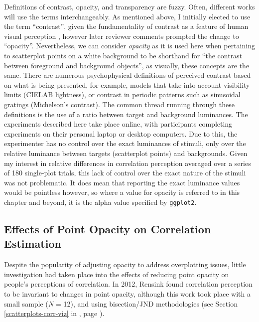 \documentclass[../main.tex]{subfiles}
\begin{document}
Definitions of contrast, opacity, and transparency are fuzzy. Often,
different works will use the terms interchangeably. As mentioned above,
I initially elected to use the term ``contrast'', given the
fundamentality of contrast as a feature of human visual perception
\cite{ginsburg_2003}, however later reviewer comments prompted the
change to ``opacity''. Nevertheless, we can consider \emph{opacity} as
it is used here when pertaining to scatterplot points on a white
background to be shorthand for ``the contrast between foreground and
background objects'', as visually, these concepts are the same. There
are numerous psychophysical definitions of perceived contrast
\cite{zuffi_2007} based on what is being presented, for example, models
that take into account visibility limits (CIELAB lightness), or contrast
in periodic patterns such as sinusoidal gratings (Michelson's contrast).
The common thread running through these definitions is the use of a
ratio between target and background luminances. The experiments
described here take place online, with participants completing
experiments on their personal laptop or desktop computers. Due to this,
the experimenter has no control over the exact luminances of stimuli,
only over the relative luminance between targets (scatterplot points)
and backgrounds. Given my interest in relative differences in
correlation perception averaged over a series of 180 single-plot trials,
this lack of control over the exact nature of the stimuli was not
problematic. It does mean that reporting the exact luminance values
would be pointless however, so where a value for opacity is referred to
in this chapter and beyond, it is the alpha value specified by
\texttt{ggplot2}.

\subsection{Effects of Point Opacity on Correlation
Estimation}\label{point-opacity-chap4}

Despite the popularity of adjusting opacity to address overplotting
issues, little investigation had taken place into the effects of
reducing point opacity on people's perceptions of correlation. In 2012,
Rensink \cite{rensink_2012} found correlation perception to be invariant
to changes in point opacity, although this work took place with a small
sample (\emph{N} = 12), and using bisection/JND methodologies (see
Section \ref{scatterplots-corr-viz} in , page
\pageref{scatterplots-corr-viz}).
\end{document}
